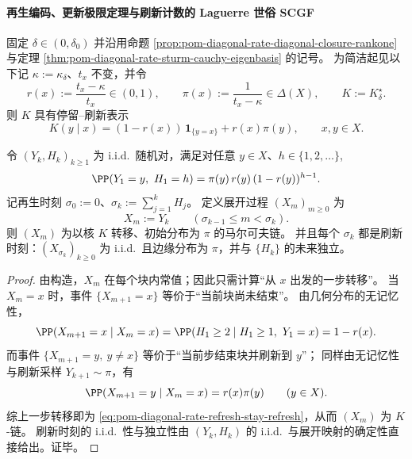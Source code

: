 \paragraph{再生编码、更新极限定理与刷新计数的 Laguerre 世俗 SCGF}
固定 \(\delta\in(0,\delta_0)\) 并沿用命题 \ref{prop:pom-diagonal-rate-diagonal-closure-rankone} 与定理 \ref{thm:pom-diagonal-rate-sturm-cauchy-eigenbasis} 的记号。
为简洁起见以下记 \(\kappa:=\kappa_\delta\)、\(t_x\) 不变，并令
\[
r(x):=\frac{t_x-\kappa}{t_x}\in(0,1),
\qquad
\pi(x):=\frac{1}{t_x-\kappa}\in\Delta(X),
\qquad
K:=K^\star_\delta.
\]
则 \(K\) 具有停留--刷新表示
\begin{equation}\label{eq:pom-diagonal-rate-refresh-stay-refresh}
K(y\mid x)=(1-r(x))\,\mathbf 1_{\{y=x\}}+r(x)\pi(y),
\qquad x,y\in X.
\end{equation}

\begin{theorem}\label{thm:pom-diagonal-rate-refresh-renewal-coding}
令 \((Y_k,H_k)_{k\ge 1}\) 为 i.i.d.\ 随机对，满足对任意 \(y\in X\)、\(h\in\{1,2,\dots\}\),
\[
\PP(Y_1=y,\ H_1=h)=\pi(y)\,r(y)\,(1-r(y))^{h-1}.
\]
记再生时刻 \(\sigma_0:=0\)、\(\sigma_k:=\sum_{j=1}^{k}H_j\)。
定义展开过程 \((X_m)_{m\ge 0}\) 为
\[
X_m:=Y_k\qquad(\sigma_{k-1}\le m<\sigma_k).
\]
则 \((X_m)\) 为以核 \(K\) 转移、初始分布为 \(\pi\) 的马尔可夫链。
并且每个 \(\sigma_k\) 都是刷新时刻：\((X_{\sigma_k})_{k\ge 0}\) 为 i.i.d.\ 且边缘分布为 \(\pi\)，并与 \(\{H_k\}\) 的未来独立。
\end{theorem}
\begin{proof}
由构造，\(X_m\) 在每个块内常值；因此只需计算“从 \(x\) 出发的一步转移”。
当 \(X_m=x\) 时，事件 \(\{X_{m+1}=x\}\) 等价于“当前块尚未结束”。
由几何分布的无记忆性，
\[
\PP(X_{m+1}=x\mid X_m=x)=\PP(H_1\ge 2\mid H_1\ge 1,\ Y_1=x)=1-r(x).
\]
而事件 \(\{X_{m+1}=y,\ y\ne x\}\) 等价于“当前步结束块并刷新到 \(y\)”；
同样由无记忆性与刷新采样 \(Y_{k+1}\sim\pi\)，有
\[
\PP(X_{m+1}=y\mid X_m=x)=r(x)\pi(y)\qquad(y\in X).
\]
综上一步转移即为 \eqref{eq:pom-diagonal-rate-refresh-stay-refresh}，从而 \((X_m)\) 为 \(K\)-链。
刷新时刻的 i.i.d.\ 性与独立性由 \((Y_k,H_k)\) 的 i.i.d.\ 与展开映射的确定性直接给出。证毕。
\end{proof}

